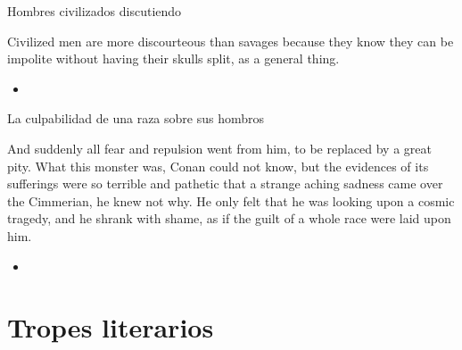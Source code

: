\begin{frame}{Hombres civilizados discutiendo}

\begin{exampleblock}{}
Civilized men are more discourteous than savages because they know they can be impolite without having their skulls split, as a general thing.
\end{exampleblock}

\begin{itemize}
	\item \textit{  }
\end{itemize}

\end{frame}

\begin{frame}{La culpabilidad de una raza sobre sus hombros}
\begin{exampleblock}{}
	And suddenly all fear and repulsion went from him, to be replaced by a great pity. What this monster was, Conan could not know, but the evidences of its sufferings were so terrible and pathetic that a strange aching sadness came over the Cimmerian, he knew not why. He only felt that he was looking upon a cosmic tragedy, and he shrank with shame, as if the guilt of a whole race were laid upon him.
\end{exampleblock}

\begin{itemize}
	\item \textit{  }
\end{itemize}

\end{frame}

\section{Tropes literarios}
\note[itemize]{
	\item
}

